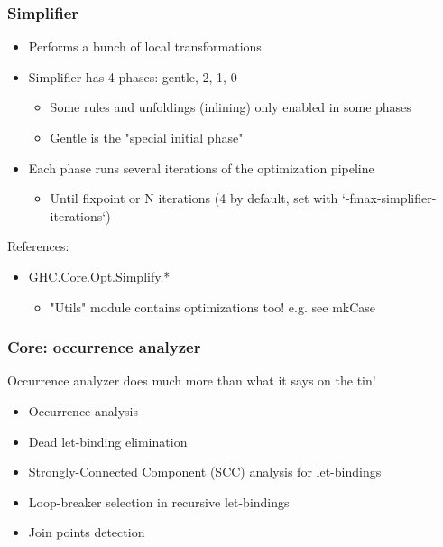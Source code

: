 \documentclass[aspectratio=169]{beamer}
\begin{document}
\begin{frame}
  \frametitle{Simplifier}
  \begin{itemize}
    \item Performs a bunch of local transformations
    \item Simplifier has 4 phases: gentle, 2, 1, 0
      \begin{itemize}
        \item Some rules and unfoldings (inlining) only enabled in some phases
        \item Gentle is the "special initial phase"
      \end{itemize}
    \item Each phase runs several iterations of the optimization pipeline
      \begin{itemize}
        \item Until fixpoint or N iterations (4 by default, set with
          `-fmax-simplifier-iterations`)
      \end{itemize}
  \end{itemize}

  References:
  \begin{itemize}
    \item GHC.Core.Opt.Simplify.*
      \begin{itemize}
        \item "Utils" module contains optimizations too! e.g. see mkCase
      \end{itemize}
  \end{itemize}
\end{frame}

\begin{frame}
  \frametitle{Core: occurrence analyzer}

  Occurrence analyzer does much more than what it says on the tin!

  \begin{itemize}
    \item Occurrence analysis
    \item Dead let-binding elimination
    \item Strongly-Connected Component (SCC) analysis for let-bindings
    \item Loop-breaker selection in recursive let-bindings
    \item Join points detection
  \end{itemize}
\end{frame}
\end{document}
